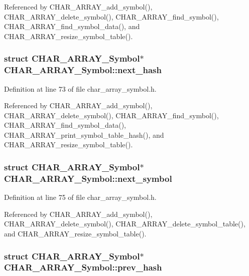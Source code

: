 Referenced by CHAR\_\-ARRAY\_\-add\_\-symbol(), CHAR\_\-ARRAY\_\-delete\_\-symbol(), CHAR\_\-ARRAY\_\-find\_\-symbol(), CHAR\_\-ARRAY\_\-find\_\-symbol\_\-data(), and CHAR\_\-ARRAY\_\-resize\_\-symbol\_\-table().
\subsubsection{\setlength{\rightskip}{0pt plus 5cm}struct \bf{CHAR\_\-ARRAY\_\-Symbol}$\ast$ \bf{CHAR\_\-ARRAY\_\-Symbol::next\_\-hash}}\label{structCHAR__ARRAY__Symbol_046750b3c930211392a8229e5983e1b1}




Definition at line 73 of file char\_\-array\_\-symbol.h.

Referenced by CHAR\_\-ARRAY\_\-add\_\-symbol(), CHAR\_\-ARRAY\_\-delete\_\-symbol(), CHAR\_\-ARRAY\_\-find\_\-symbol(), CHAR\_\-ARRAY\_\-find\_\-symbol\_\-data(), CHAR\_\-ARRAY\_\-print\_\-symbol\_\-table\_\-hash(), and CHAR\_\-ARRAY\_\-resize\_\-symbol\_\-table().
\subsubsection{\setlength{\rightskip}{0pt plus 5cm}struct \bf{CHAR\_\-ARRAY\_\-Symbol}$\ast$ \bf{CHAR\_\-ARRAY\_\-Symbol::next\_\-symbol}}\label{structCHAR__ARRAY__Symbol_b85f8cfb1e5f60532860a19c5bc5872f}




Definition at line 75 of file char\_\-array\_\-symbol.h.

Referenced by CHAR\_\-ARRAY\_\-add\_\-symbol(), CHAR\_\-ARRAY\_\-delete\_\-symbol(), CHAR\_\-ARRAY\_\-delete\_\-symbol\_\-table(), and CHAR\_\-ARRAY\_\-resize\_\-symbol\_\-table().
\subsubsection{\setlength{\rightskip}{0pt plus 5cm}struct \bf{CHAR\_\-ARRAY\_\-Symbol}$\ast$ \bf{CHAR\_\-ARRAY\_\-Symbol::prev\_\-hash}}\label{structCHAR__ARRAY__Symbol_774e9252114a0a8cc0e5d38b97a08f5b}




